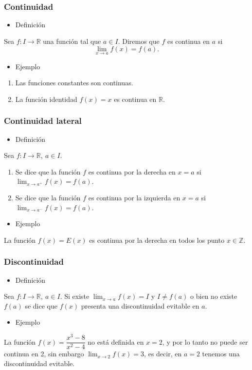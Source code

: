 \subsubsection{Continuidad}
\begin{itemize}[label=\color{red}\textbullet, leftmargin=*]
	\item \color{lightblue}Definición
\end{itemize}
Sea $f:I\rightarrow\mathbb{R}$ una función tal que $a\in I$. Diremos que $f$ es continua en $a$ si \[ \lim_{x\to a}f(x)=f(a). \]
\begin{itemize}[label=\color{red}\textbullet, leftmargin=*]
	\item \color{lightblue}Ejemplo
\end{itemize}
\begin{enumerate}[label=\arabic*)]
	\item Las funciones constantes son continuas.
	\item La función identidad $f(x)=x$ es continua en $\mathbb{R}$.
\end{enumerate}
\subsubsection{Continuidad lateral}
\begin{itemize}[label=\color{red}\textbullet, leftmargin=*]
	\item \color{lightblue}Definición
\end{itemize}
Sea $f:I\rightarrow\mathbb{R},~a\in I$.
\begin{enumerate}[label=\arabic*)]
	\item Se dice que la función $f$ es continua por la derecha en $x=a$ si $\lim_{x\to a^+}f(x)=f(a)$.
	\item Se dice que la función $f$ es continua por la izquierda en $x=a$ si $\lim_{x\to a^-}f(x)=f(a)$.
\end{enumerate}
\begin{itemize}[label=\color{red}\textbullet, leftmargin=*]
	\item \color{lightblue}Ejemplo
\end{itemize}
La función $f(x)=E(x)$ es continua por la derecha en todos los punto $x\in\mathbb{Z}$.
\subsubsection{Discontinuidad}
\begin{itemize}[label=\color{red}\textbullet, leftmargin=*]
	\item \color{lightblue}Definición
\end{itemize}
Sea $f:I\rightarrow\mathbb{R},~a\in I$. Si existe $\lim_{x\to a}f(x)=I$ y $I\neq f(a)$ o bien no existe $f(a)$ se dice que $f(x)$ presenta una discontinuidad evitable en $a$.
\begin{itemize}[label=\color{red}\textbullet, leftmargin=*]
	\item \color{lightblue}Ejemplo
\end{itemize}
La función $f(x)=\dfrac{x^3-8}{x^2-4}$ no está definida en $x=2$, y por lo tanto no puede ser continua en 2, sin embargo $\lim_{x\to 2}f(x)=3$, es decir, en $a=2$ tenemos una discontinuidad evitable.
